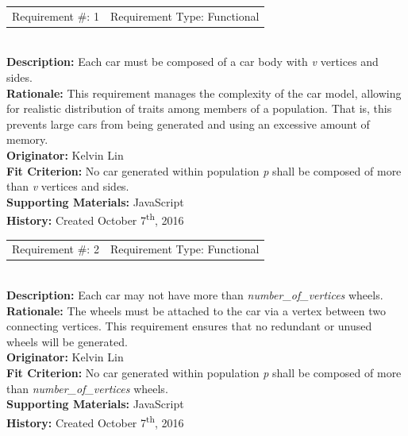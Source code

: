 \documentclass[12pt, titlepage]{article}
\begin{document}
\begin{reqbox}
	\begin{tabular}{cc}
		Requirement \#: 1 & Requirement Type: Functional \\
	\end{tabular} \\
	\textbf{Description:} Each car must be composed of a car body with \textit{v} vertices and sides. 
	\\
	\textbf{Rationale:}  This requirement manages the complexity of the car model, 
	allowing for realistic distribution of traits among members of a population. 
	That is, this prevents large cars from being generated and using an excessive 
	amount of memory. \\
	\textbf{Originator:} Kelvin Lin\\
	\textbf{Fit Criterion:} No car generated within population \textit{p} shall be 
	composed of more than \textit{v} vertices and sides.\\
	\textbf{Supporting Materials:} JavaScript \\
	\textbf{History:} Created October 7\textsuperscript{th}, 2016
\end{reqbox}

\newpage

\begin{reqbox}
	\begin{tabular}{cc}
		Requirement \#: 2 & Requirement Type: Functional \\
	\end{tabular} \\
	\textbf{Description:} Each car may not have more than 
	\textit{number\_of\_vertices} wheels. \\
	\textbf{Rationale:}  The wheels must be attached to the car via a vertex 
between 
	two connecting vertices. This requirement ensures that no redundant or unused 
	wheels will be generated.\\
	\textbf{Originator:} Kelvin Lin\\
	\textbf{Fit Criterion:} No car generated within population \textit{p} shall be 
	composed of more than \textit{number\_of\_vertices} wheels.\\
	\textbf{Supporting Materials:} JavaScript \\
	\textbf{History:} Created October 7\textsuperscript{th}, 2016
\end{reqbox}
\end{document}
